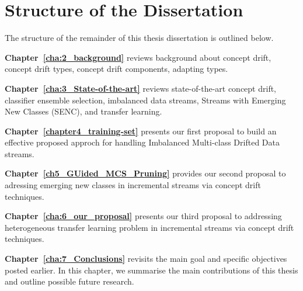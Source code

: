 
\section{Structure of the Dissertation}
\label{sec:1_introduction_organizations}
The structure of the remainder of this thesis dissertation is outlined below.
\begin{description}	
	\item \textbf{Chapter~\ref{cha:2_background}} reviews background about concept drift, concept drift types, concept drift components, adapting types.  
	
	\item \textbf{Chapter~\ref{cha:3_State-of-the-art}} reviews state-of-the-art  concept drift, classifier ensemble selection, imbalanced data streams, Streams with Emerging New Classes (SENC), and transfer learning.  
	
	\item \textbf{Chapter~\ref{chapter4_training-set}} presents our first proposal to build an effective proposed approch for  handling Imbalanced Multi-class Drifted Data streams.
	
	\item \textbf{Chapter~\ref{ch5_GUided_MCS_Pruning}} provides our second proposal to adressing emerging new classes in incremental streams via concept drift techniques. 
	
	\item \textbf{Chapter~\ref{cha:6_our_proposal}} presents our third proposal to addressing heterogeneous transfer learning problem  in incremental streams via concept drift techniques.
	
	\item \textbf{Chapter~\ref{cha:7_Conclusions}} revisits the main goal and specific objectives posted earlier. In this chapter, we summarise the main contributions of this thesis and outline possible future research.


\end{description}